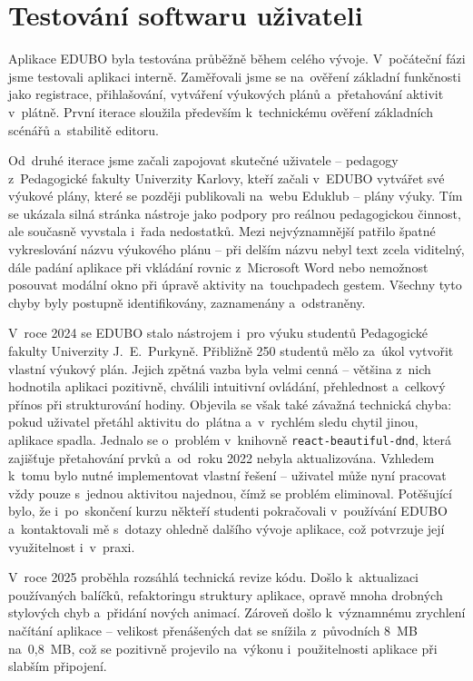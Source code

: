 \documentclass[male,czech,api_bc]{kitheses}
\begin{document}
\chapter{Testování softwaru uživateli}

Aplikace EDUBO byla testována průběžně během celého vývoje. V~počáteční fázi jsme testovali aplikaci interně. Zaměřovali jsme se na~ověření základní funkčnosti jako registrace, přihlašování, vytváření výukových plánů a~přetahování aktivit v~plátně. První iterace sloužila především k~technickému ověření základních scénářů a~stabilitě editoru.

Od~druhé iterace jsme začali zapojovat skutečné uživatele – pedagogy z~Pedagogické fakulty Univerzity Karlovy, kteří začali v~EDUBO vytvářet své výukové plány, které se později publikovali na~webu Eduklub – plány výuky. Tím se ukázala silná stránka nástroje jako podpory pro reálnou pedagogickou činnost, ale současně vyvstala i~řada nedostatků. Mezi nejvýznamnější patřilo špatné vykreslování názvu výukového plánu – při delším názvu nebyl text zcela viditelný, dále padání aplikace při vkládání rovnic z~Microsoft Word nebo nemožnost posouvat modální okno při úpravě aktivity na~touchpadech gestem. Všechny tyto chyby byly postupně identifikovány, zaznamenány a~odstraněny.

V~roce 2024 se EDUBO stalo nástrojem i~pro výuku studentů Pedagogické fakulty Univerzity J.~E.~Purkyně. Přibližně 250 studentů mělo za~úkol vytvořit vlastní výukový plán. Jejich zpětná vazba byla velmi cenná – většina z~nich hodnotila aplikaci pozitivně, chválili intuitivní ovládání, přehlednost a~celkový přínos při strukturování hodiny. Objevila se však také závažná technická chyba: pokud uživatel přetáhl aktivitu do~plátna a~v~rychlém sledu chytil jinou, aplikace spadla. Jednalo se o~problém v~knihovně \texttt{react-beautiful-dnd}, která zajišťuje přetahování prvků a~od~roku 2022 nebyla aktualizována. Vzhledem k~tomu bylo nutné implementovat vlastní řešení – uživatel může nyní pracovat vždy pouze s~jednou aktivitou najednou, čímž se problém eliminoval. Potěšující bylo, že i~po~skončení kurzu někteří studenti pokračovali v~používání EDUBO a~kontaktovali mě s~dotazy ohledně dalšího vývoje aplikace, což potvrzuje její využitelnost i~v~praxi.

V~roce 2025 proběhla rozsáhlá technická revize kódu. Došlo k~aktualizaci používaných balíčků, refaktoringu struktury aplikace, opravě mnoha drobných stylových chyb a~přidání nových animací. Zároveň došlo k~významnému zrychlení načítání aplikace – velikost přenášených dat se snížila z~původních 8~MB na~0{,}8~MB, což se pozitivně projevilo na~výkonu i~použitelnosti aplikace při slabším připojení.
\end{document}
